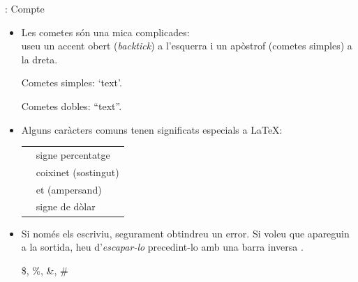 \begin{frame}[fragile]{\insertsubsection{}: Compte}
\small
\begin{itemize}
\item Les cometes són una mica complicades:\\
useu un accent obert (\textit{backtick}) \keystroke{\`} a l'esquerra i un apòstrof (cometes simples)  a la dreta.
\begin{exampletwouptiny}
Cometes simples: `text'.

Cometes dobles: ``text''.
\end{exampletwouptiny}

\item Alguns caràcters comuns tenen significats especials a \LaTeX:\\[1ex]
\begin{tabular}{cl}
\keystrokebftt{\%} & signe percentatge         \\
\keystrokebftt{\#} & coixinet (sostingut)      \\
\keystrokebftt{\&} & et (ampersand)            \\
\keystrokebftt{\$} & signe de dòlar            \\
\end{tabular}
\item Si només els escriviu, segurament obtindreu un error. 
    Si voleu que apareguin a la sortida, heu d'\textit{escapar-lo} precedint-lo amb una barra inversa \keystroke{\textbackslash}.
\begin{exampletwoup}
\$, \%, \&, \#
\end{exampletwoup}
\end{itemize}
\end{frame}

